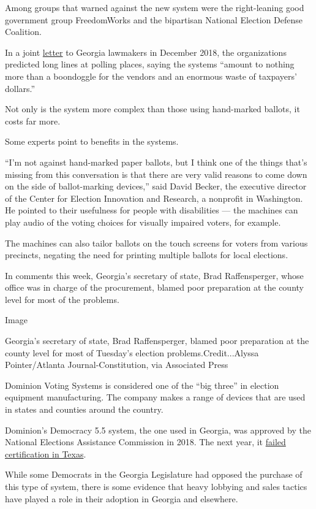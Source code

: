 Among groups that warned against the new system were the right-leaning
good government group FreedomWorks and the bipartisan National Election
Defense Coalition.

In a joint
\href{https://www.electiondefense.org/lettersafecommission}{letter} to
Georgia lawmakers in December 2018, the organizations predicted long
lines at polling places, saying the systems ``amount to nothing more
than a boondoggle for the vendors and an enormous waste of taxpayers'
dollars.''

Not only is the system more complex than those using hand-marked
ballots, it costs far more.

Some experts point to benefits in the systems.

``I'm not against hand-marked paper ballots, but I think one of the
things that's missing from this conversation is that there are very
valid reasons to come down on the side of ballot-marking devices,'' said
David Becker, the executive director of the Center for Election
Innovation and Research, a nonprofit in Washington. He pointed to their
usefulness for people with disabilities --- the machines can play audio
of the voting choices for visually impaired voters, for example.

The machines can also tailor ballots on the touch screens for voters
from various precincts, negating the need for printing multiple ballots
for local elections.

In comments this week, Georgia's secretary of state, Brad Raffensperger,
whose office was in charge of the procurement, blamed poor preparation
at the county level for most of the problems.

Image

Georgia's secretary of state, Brad Raffensperger, blamed poor
preparation at the county level for most of Tuesday's election
problems.Credit...Alyssa Pointer/Atlanta Journal-Constitution, via
Associated Press

Dominion Voting Systems is considered one of the ``big three'' in
election equipment manufacturing. The company makes a range of devices
that are used in states and counties around the country.

Dominion's Democracy 5.5 system, the one used in Georgia, was approved
by the National Elections Assistance Commission in 2018. The next year,
it
\href{https://www.sos.texas.gov/elections/forms/sysexam/oct2019-hurley.pdf}{failed
certification in Texas}.

While some Democrats in the Georgia Legislature had opposed the purchase
of this type of system, there is some evidence that heavy lobbying and
sales tactics have played a role in their adoption in Georgia and
elsewhere.

